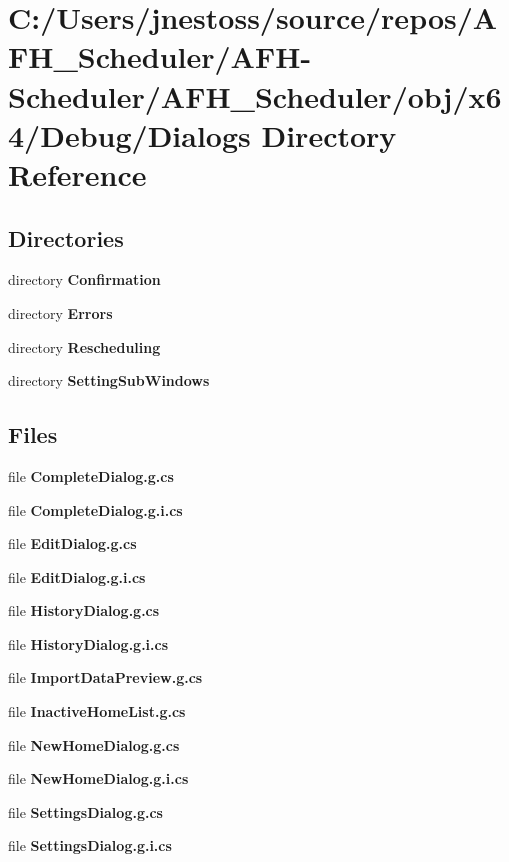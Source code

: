 \section{C\+:/\+Users/jnestoss/source/repos/\+A\+F\+H\+\_\+\+Scheduler/\+A\+F\+H-\/\+Scheduler/\+A\+F\+H\+\_\+\+Scheduler/obj/x64/\+Debug/\+Dialogs Directory Reference}
\label{dir_21ea455dc70360f6ef7ad7aec21eadb5}
\subsection*{Directories}
\begin{DoxyCompactItemize}
\item 
directory \textbf{ Confirmation}
\item 
directory \textbf{ Errors}
\item 
directory \textbf{ Rescheduling}
\item 
directory \textbf{ Setting\+Sub\+Windows}
\end{DoxyCompactItemize}
\subsection*{Files}
\begin{DoxyCompactItemize}
\item 
file \textbf{ Complete\+Dialog.\+g.\+cs}
\item 
file \textbf{ Complete\+Dialog.\+g.\+i.\+cs}
\item 
file \textbf{ Edit\+Dialog.\+g.\+cs}
\item 
file \textbf{ Edit\+Dialog.\+g.\+i.\+cs}
\item 
file \textbf{ History\+Dialog.\+g.\+cs}
\item 
file \textbf{ History\+Dialog.\+g.\+i.\+cs}
\item 
file \textbf{ Import\+Data\+Preview.\+g.\+cs}
\item 
file \textbf{ Inactive\+Home\+List.\+g.\+cs}
\item 
file \textbf{ New\+Home\+Dialog.\+g.\+cs}
\item 
file \textbf{ New\+Home\+Dialog.\+g.\+i.\+cs}
\item 
file \textbf{ Settings\+Dialog.\+g.\+cs}
\item 
file \textbf{ Settings\+Dialog.\+g.\+i.\+cs}
\end{DoxyCompactItemize}
